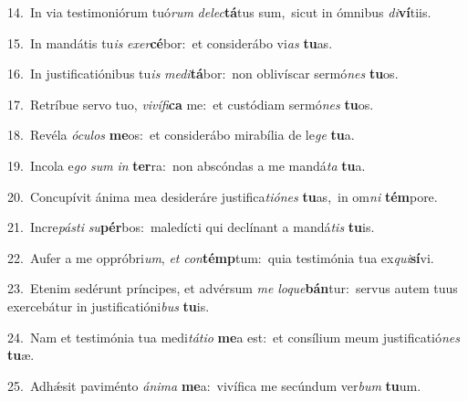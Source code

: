 {\numbfont\textcolor{\numbcolor}{14.}}~In via testimoniórum tuó\textit{rum} \textit{de}\-\textit{lec}\textbf{tá}tus sum,~\star sicut in ómnibus \textit{di}\-\textbf{ví}tiis.\par
{\numbfont\textcolor{\numbcolor}{15.}}~In mandátis tu\textit{is} \textit{ex}\-\textit{er}\textbf{cé}bor:~\star et considerábo vi\textit{as} \textbf{tu}\-as.\par
{\numbfont\textcolor{\numbcolor}{16.}}~In justificatiónibus tu\textit{is} \textit{me}\-\textit{di}\textbf{tá}bor:~\star non oblivíscar sermó\textit{nes} \textbf{tu}\-os.\par
{\numbfont\textcolor{\numbcolor}{17.}}~Retríbue servo tuo, \textit{vi}\-\textit{ví}\textit{fi}\textbf{ca} me:~\star et custódiam sermó\textit{nes} \textbf{tu}\-os.\par
{\numbfont\textcolor{\numbcolor}{18.}}~Revéla \textit{ó}\-\textit{cu}\textit{los} \textbf{me}\-os:~\star et considerábo mirabília de le\textit{ge} \textbf{tu}\-a.\par
{\numbfont\textcolor{\numbcolor}{19.}}~Incola e\textit{go} \textit{sum} \textit{in} \textbf{ter}\-ra:~\star non abscóndas a me mandá\textit{ta} \textbf{tu}\-a.\par
{\numbfont\textcolor{\numbcolor}{20.}}~Concupívit ánima mea desideráre justifica\-\textit{ti}\-\textit{ó}\textit{nes} \textbf{tu}\-as,~\star in om\textit{ni} \textbf{tém}\-pore.\par
{\numbfont\textcolor{\numbcolor}{21.}}~Incre\-\textit{pás}\-\textit{ti} \textit{su}\-\textbf{pér}bos:~\star maledícti qui declínant a mandá\textit{tis} \textbf{tu}\-is.\par
{\numbfont\textcolor{\numbcolor}{22.}}~Aufer a me oppróbri\-\textit{um}\-, \textit{et} \textit{con}\-\textbf{témp}tum:~\star quia testimónia tua ex\-\textit{qui}\-\textbf{sí}vi.\par
{\numbfont\textcolor{\numbcolor}{23.}}~Etenim sedérunt príncipes, et advérsum \textit{me} \textit{lo}\-\textit{que}\textbf{bán}tur:~\star servus autem tuus exercebátur in justificatióni\textit{bus} \textbf{tu}\-is.\par
{\numbfont\textcolor{\numbcolor}{24.}}~Nam et testimónia tua medi\-\textit{tá}\-\textit{ti}\textit{o} \textbf{me}\-a est:~\star et consílium meum justificatió\textit{nes} \textbf{tu}\-æ.\par
{\numbfont\textcolor{\numbcolor}{25.}}~Adhǽsit paviménto \textit{á}\-\textit{ni}\textit{ma} \textbf{me}\-a:~\star vivífica me secúndum ver\textit{bum} \textbf{tu}\-um.\par
